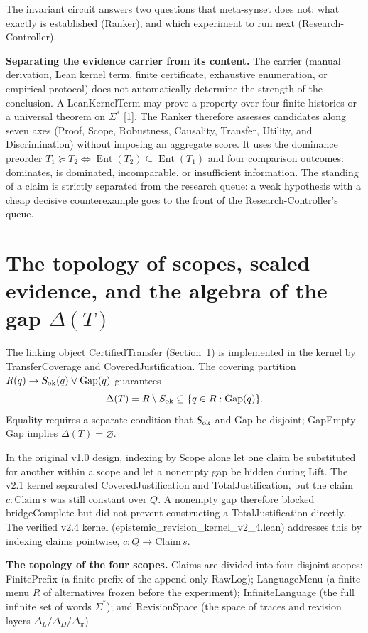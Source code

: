 \documentclass[11pt,a4paper]{article}
\begin{document}
The invariant circuit answers two questions that meta-synset does not: what exactly is established (Ranker), and which experiment to run next (Research-Controller).

\textbf{Separating the evidence carrier from its content.} The carrier (manual derivation, Lean kernel term, finite certificate, exhaustive enumeration, or empirical protocol) does not automatically determine the strength of the conclusion. A LeanKernelTerm may prove a property over four finite histories or a universal theorem on \(\Sigma^*\) [1]. The Ranker therefore assesses candidates along seven axes (Proof, Scope, Robustness, Causality, Transfer, Utility, and Discrimination) without imposing an aggregate score. It uses the dominance preorder \(T_1\succeq T_2\iff\operatorname{Ent}(T_2)\subseteq\operatorname{Ent}(T_1)\) and four comparison outcomes: dominates, is dominated, incomparable, or insufficient information. The standing of a claim is strictly separated from the research queue: a weak hypothesis with a cheap decisive counterexample goes to the front of the Research-Controller's queue.

\section{The topology of scopes, sealed evidence, and the algebra of the gap \(\Delta(T)\)}

The linking object CertifiedTransfer (Section~1) is implemented in the kernel by TransferCoverage and CoveredJustification. The covering partition \(R(q)\to S_{\rm ok}(q)\lor \mathrm{Gap}(q)\) guarantees
\[
\Delta(T)=R\setminus S_{\rm ok}\subseteq\{q\in R:\mathrm{Gap}(q)\}.
\]
Equality requires a separate condition that \(S_{\rm ok}\) and Gap be disjoint; GapEmpty Gap implies \(\Delta(T)=\varnothing\).

In the original v1.0 design, indexing by Scope alone let one claim be substituted for another within a scope and let a nonempty gap be hidden during Lift. The v2.1 kernel separated CoveredJustification and TotalJustification, but the claim \(c:\mathrm{Claim}\,s\) was still constant over \(Q\). A nonempty gap therefore blocked bridgeComplete but did not prevent constructing a TotalJustification directly. The verified v2.4 kernel (epistemic\_\allowbreak revision\_\allowbreak kernel\_\allowbreak v2\_\allowbreak 4.lean) addresses this by indexing claims pointwise, \(c:Q\to\mathrm{Claim}\,s\).

\textbf{The topology of the four scopes.} Claims are divided into four disjoint scopes: FinitePrefix (a finite prefix of the append-only RawLog); LanguageMenu (a finite menu \(R\) of alternatives frozen before the experiment); InfiniteLanguage (the full infinite set of words \(\Sigma^*\)); and RevisionSpace (the space of traces and revision layers \(\Delta_L/\Delta_D/\Delta_\pi\)).
\end{document}
